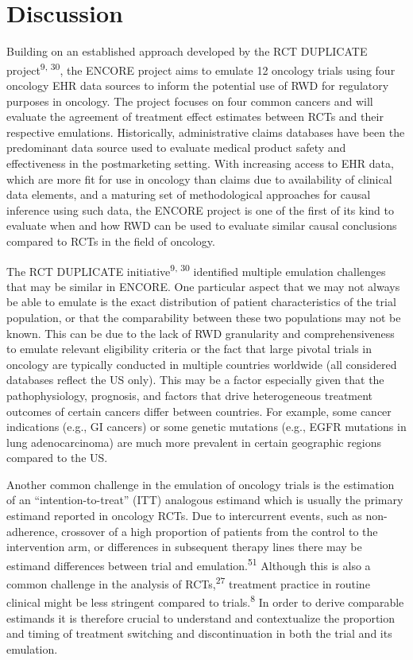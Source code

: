 \documentclass[
  letterpaper,
  DIV=11,
  numbers=noendperiod]{scrartcl}
\begin{document}
\section{Discussion}\label{discussion}

Building on an established approach developed by the RCT DUPLICATE
project\textsuperscript{9, 30}, the ENCORE project aims to emulate 12
oncology trials using four oncology EHR data sources to inform the
potential use of RWD for regulatory purposes in oncology. The project
focuses on four common cancers and will evaluate the agreement of
treatment effect estimates between RCTs and their respective emulations.
Historically, administrative claims databases have been the predominant
data source used to evaluate medical product safety and effectiveness in
the postmarketing setting. With increasing access to EHR data, which are
more fit for use in oncology than claims due to availability of clinical
data elements, and a maturing set of methodological approaches for
causal inference using such data, the ENCORE project is one of the first
of its kind to evaluate when and how RWD can be used to evaluate similar
causal conclusions compared to RCTs in the field of oncology.

The RCT DUPLICATE initiative\textsuperscript{9, 30} identified multiple
emulation challenges that may be similar in ENCORE. One particular
aspect that we may not always be able to emulate is the exact
distribution of patient characteristics of the trial population, or that
the comparability between these two populations may not be known. This
can be due to the lack of RWD granularity and comprehensiveness to
emulate relevant eligibility criteria or the fact that large pivotal
trials in oncology are typically conducted in multiple countries
worldwide (all considered databases reflect the US only). This may be a
factor especially given that the pathophysiology, prognosis, and factors
that drive heterogeneous treatment outcomes of certain cancers differ
between countries. For example, some cancer indications (e.g., GI
cancers) or some genetic mutations (e.g., EGFR mutations in lung
adenocarcinoma) are much more prevalent in certain geographic regions
compared to the US.

Another common challenge in the emulation of oncology trials is the
estimation of an ``intention-to-treat'' (ITT) analogous estimand which
is usually the primary estimand reported in oncology RCTs. Due to
intercurrent events, such as non-adherence, crossover of a high
proportion of patients from the control to the intervention arm, or
differences in subsequent therapy lines there may be estimand
differences between trial and emulation.\textsuperscript{51} Although
this is also a common challenge in the analysis of
RCTs,\textsuperscript{27} treatment practice in routine clinical might
be less stringent compared to trials.\textsuperscript{8} In order to
derive comparable estimands it is therefore crucial to understand and
contextualize the proportion and timing of treatment switching and
discontinuation in both the trial and its emulation.
\end{document}
